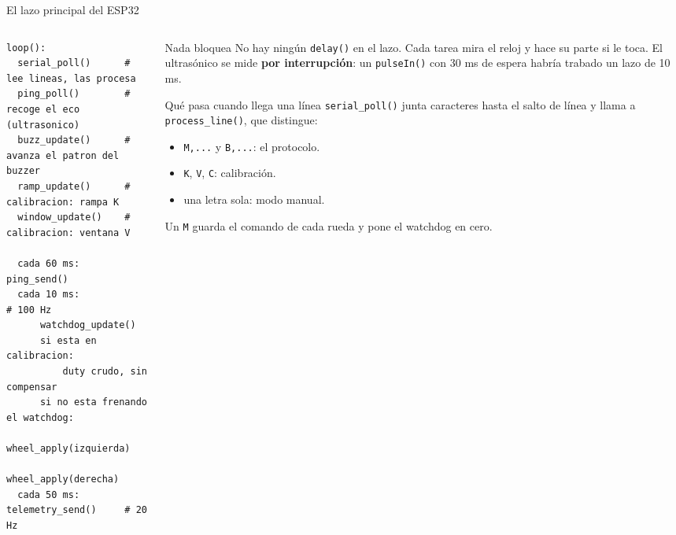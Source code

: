 \begin{frame}[fragile]{El lazo principal del ESP32}
\begin{columns}[T,onlytextwidth]
\begin{column}{0.50\textwidth}
\footnotesize
\begin{verbatim}
loop():
  serial_poll()      # lee lineas, las procesa
  ping_poll()        # recoge el eco (ultrasonico)
  buzz_update()      # avanza el patron del buzzer
  ramp_update()      # calibracion: rampa K
  window_update()    # calibracion: ventana V

  cada 60 ms:  ping_send()
  cada 10 ms:                       # 100 Hz
      watchdog_update()
      si esta en calibracion:
          duty crudo, sin compensar
      si no esta frenando el watchdog:
          wheel_apply(izquierda)
          wheel_apply(derecha)
  cada 50 ms:  telemetry_send()     # 20 Hz
\end{verbatim}
\end{column}
\begin{column}{0.48\textwidth}
\footnotesize
\begin{block}{Nada bloquea}
  No hay ningún \verb|delay()| en el lazo. Cada tarea mira el reloj y hace su
  parte si le toca. El ultrasónico se mide \textbf{por interrupción}: un
  \verb|pulseIn()| con 30 ms de espera habría trabado un lazo de 10 ms.
\end{block}
\begin{block}{Qué pasa cuando llega una línea}
  \verb|serial_poll()| junta caracteres hasta el salto de línea y llama a
  \verb|process_line()|, que distingue:
  \begin{itemize}
    \item \verb|M,...| y \verb|B,...|: el protocolo.
    \item \verb|K|, \verb|V|, \verb|C|: calibración.
    \item una letra sola: modo manual.
  \end{itemize}
  Un \verb|M| guarda el comando de cada rueda y pone el watchdog en cero.
\end{block}
\end{column}
\end{columns}
\end{frame}

